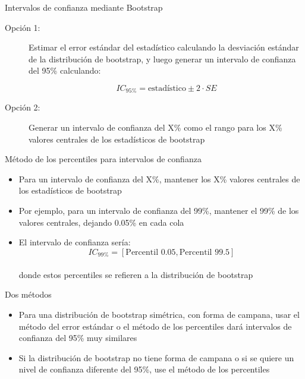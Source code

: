 \documentclass[11pt, aspectratio=169]{beamer}
\begin{document}
\begin{frame}
{Intervalos de confianza mediante Bootstrap}{}
 \centering \Large

 \begin{description}
 \item[Opción 1:] Estimar el error estándar del estadístico calculando la
 desviación estándar de la distribución de bootstrap, y luego generar un
 intervalo de confianza del 95\% calculando:

 \[ IC_{95\%}= \text{estadístico} \pm 2 \cdot SE \]

 \item[Opción 2:] Generar un intervalo de confianza del X\% como el rango
 para los X\% valores centrales de los estadísticos de bootstrap
 \end{description}
\end{frame}

\begin{frame}
{Método de los percentiles para intervalos de confianza}{}
 \centering \large

 \begin{itemize} \itemsep 1em
 \item Para un intervalo de confianza del X\%, mantener los X\% valores
 centrales de los estadísticos de bootstrap

 \item Por ejemplo, para un intervalo de confianza del 99\%, mantener el
 99\% de los valores centrales, dejando 0.05\% en cada cola

 \item El intervalo de confianza sería:\\
 \[ IC_{99\%} = [\text{Percentil 0.05}, \text{Percentil 99.5}] \]\\
 donde estos percentiles se refieren a la distribución de bootstrap
 \end{itemize}
\end{frame}

\begin{frame}
{Dos métodos}{}
 \centering \Large

 \begin{itemize} \itemsep 1em
 \item Para una distribución de bootstrap simétrica, con forma de campana,
 usar el método del error estándar o el método de los percentiles dará
 intervalos de confianza del 95\% muy similares

 \item Si la distribución de bootstrap no tiene forma de campana o si se
 quiere un nivel de confianza diferente del 95\%, use el método de los
 percentiles
 \end{itemize}
\end{frame}
\end{document}
